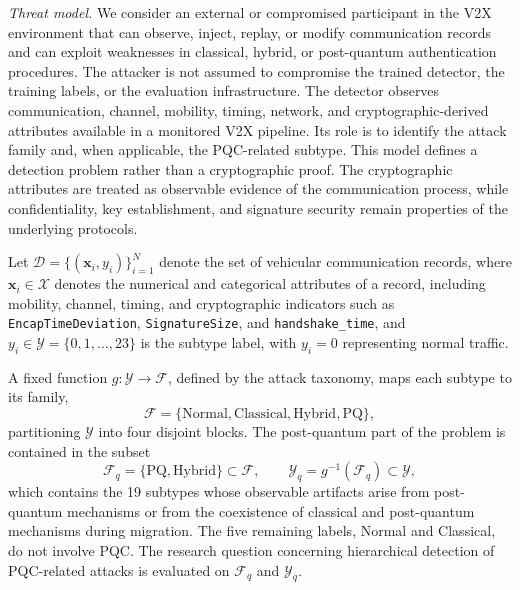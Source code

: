 \documentclass{IEEEoj}
\begin{document}
\textit{Threat model.} We consider an external or compromised participant in the V2X environment that can observe, inject, replay, or modify communication records and can exploit weaknesses in classical, hybrid, or post-quantum authentication procedures. The attacker is not assumed to compromise the trained detector, the training labels, or the evaluation infrastructure. The detector observes communication, channel, mobility, timing, network, and cryptographic-derived attributes available in a monitored V2X pipeline. Its role is to identify the attack family and, when applicable, the PQC-related subtype. This model defines a detection problem rather than a cryptographic proof. The cryptographic attributes are treated as observable evidence of the communication process, while confidentiality, key establishment, and signature security remain properties of the underlying protocols.

Let $\mathcal{D} = \{(\mathbf{x}_i, y_i)\}_{i=1}^{N}$ denote the set of
vehicular communication records, where $\mathbf{x}_i \in \mathcal{X}$ denotes
the numerical and categorical attributes of a record, including mobility,
channel, timing, and cryptographic indicators such as
\texttt{EncapTimeDeviation}, \texttt{SignatureSize}, and \texttt{handshake\_time},
and $y_i \in \mathcal{Y} = \{0,1,\dots,23\}$ is the subtype label, with
$y_i = 0$ representing normal traffic.

A fixed function $g:\mathcal{Y}\rightarrow\mathcal{F}$, defined by the attack
taxonomy, maps each subtype to its family,
\begin{equation}
\mathcal{F} = \{\text{Normal}, \text{Classical}, \text{Hybrid}, \text{PQ}\},
\end{equation}
partitioning $\mathcal{Y}$ into four disjoint blocks. The post-quantum part of
the problem is contained in the subset
\begin{equation}
\mathcal{F}_q = \{\text{PQ}, \text{Hybrid}\} \subset \mathcal{F}, \qquad
\mathcal{Y}_q = g^{-1}(\mathcal{F}_q) \subset \mathcal{Y},
\end{equation}
which contains the 19 subtypes whose observable artifacts arise from
post-quantum mechanisms or from the coexistence of classical and post-quantum
mechanisms during migration. The five remaining labels, Normal and Classical,
do not involve PQC. The research question concerning hierarchical detection of
PQC-related attacks is evaluated on $\mathcal{F}_q$ and $\mathcal{Y}_q$.
\end{document}
